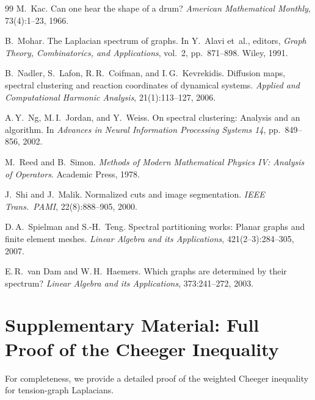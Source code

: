 \documentclass[12pt,letterpaper]{article}
\begin{document}
\begin{thebibliography}{99}
M.~Kac.
\newblock Can one hear the shape of a drum?
\newblock \emph{American Mathematical Monthly}, 73(4):1--23, 1966.

B.~Mohar.
\newblock The Laplacian spectrum of graphs.
\newblock In Y.~Alavi et~al., editors, \emph{Graph Theory, Combinatorics, and Applications}, vol.~2, pp.~871--898. Wiley, 1991.

B.~Nadler, S.~Lafon, R.\,R.~Coifman, and I.\,G.~Kevrekidis.
\newblock Diffusion maps, spectral clustering and reaction coordinates of dynamical systems.
\newblock \emph{Applied and Computational Harmonic Analysis}, 21(1):113--127, 2006.

A.\,Y.~Ng, M.\,I.~Jordan, and Y.~Weiss.
\newblock On spectral clustering: Analysis and an algorithm.
\newblock In \emph{Advances in Neural Information Processing Systems 14}, pp.~849--856, 2002.

M.~Reed and B.~Simon.
\newblock \emph{Methods of Modern Mathematical Physics IV: Analysis of Operators}.
\newblock Academic Press, 1978.

J.~Shi and J.~Malik.
\newblock Normalized cuts and image segmentation.
\newblock \emph{IEEE Trans.\ PAMI}, 22(8):888--905, 2000.

D.\,A.~Spielman and S.-H.~Teng.
\newblock Spectral partitioning works: Planar graphs and finite element meshes.
\newblock \emph{Linear Algebra and its Applications}, 421(2--3):284--305, 2007.

E.\,R.~van Dam and W.\,H.~Haemers.
\newblock Which graphs are determined by their spectrum?
\newblock \emph{Linear Algebra and its Applications}, 373:241--272, 2003.

\end{thebibliography}

\newpage
\appendix
\section{Supplementary Material: Full Proof of the Cheeger Inequality}
\label{app:cheeger}

For completeness, we provide a detailed proof of the weighted Cheeger inequality for tension-graph Laplacians.
\end{document}
